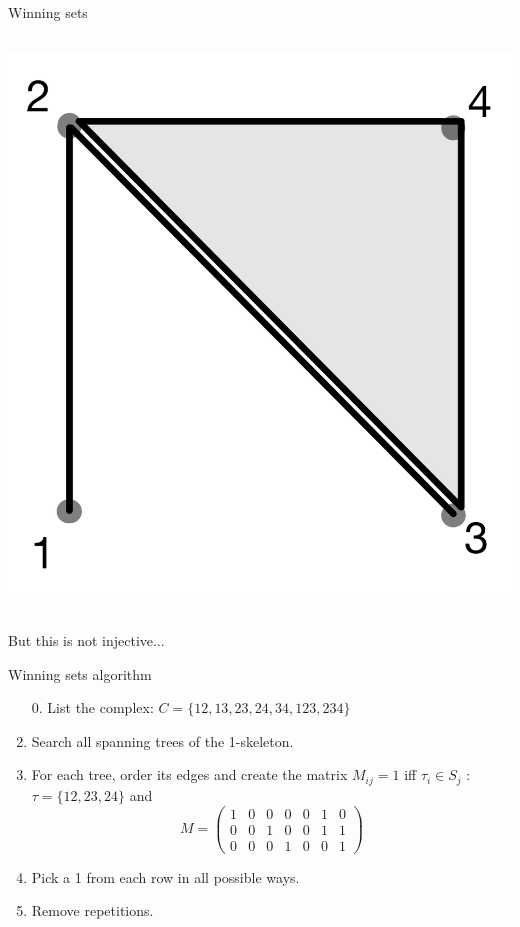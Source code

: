 \documentclass{beamer}
\begin{document}
\begin{frame}{Winning sets}
\begin{columns}
\begin{column}{0.45\textwidth}
\begin{center}
     \includegraphics[scale=0.08]{images/Step3.png}
     \end{center}
\end{column}
\end{columns}
\vspace{0.5cm}
\pause

But this is not injective... 
\end{frame}

\begin{frame}{Winning sets algorithm}

\begin{enumerate}
    \pause
    \item[0.] List the complex\pause: $C = \{ 12,13,23,24,34,123,234 \}$
    \pause
    \item Search all spanning trees of the 1-skeleton. 
    \pause
    \item For each tree, order its edges and create the matrix $M_{ij} = 1$ iff $\tau_i \in S_j$ \pause : $\tau = \{12,23,24\}$ \pause and $$ M = \left( \begin{matrix} 1 & 0 & 0 & 0 & 0 & 1 & 0 \\ 0 & 0 & 1 & 0 & 0 & 1 & 1 \\ 0 & 0 & 0 & 1 & 0 & 0 & 1 \end{matrix} \right) $$
    \pause
    \item Pick a 1 from each row in all possible ways. 
    \pause
    \item Remove repetitions. 
\end{enumerate}
    
\end{frame}
\end{document}
